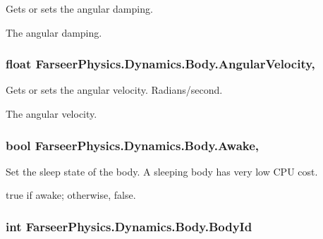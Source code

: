 Gets or sets the angular damping. 

The angular damping.\hypertarget{class_farseer_physics_1_1_dynamics_1_1_body_a140f114a8b8bc2fdffa415b6aa7b9427}{
\subsubsection[{Angular\+Velocity}]{\setlength{\rightskip}{0pt plus 5cm}float Farseer\+Physics.\+Dynamics.\+Body.\+Angular\+Velocity\hspace{0.3cm}{\ttfamily [get]}, {\ttfamily [set]}}}\label{class_farseer_physics_1_1_dynamics_1_1_body_a140f114a8b8bc2fdffa415b6aa7b9427}


Gets or sets the angular velocity. Radians/second. 

The angular velocity.\hypertarget{class_farseer_physics_1_1_dynamics_1_1_body_a6641e547d28ab0560ecc8c37affc2b72}{
\subsubsection[{Awake}]{\setlength{\rightskip}{0pt plus 5cm}bool Farseer\+Physics.\+Dynamics.\+Body.\+Awake\hspace{0.3cm}{\ttfamily [get]}, {\ttfamily [set]}}}\label{class_farseer_physics_1_1_dynamics_1_1_body_a6641e547d28ab0560ecc8c37affc2b72}


Set the sleep state of the body. A sleeping body has very low C\+P\+U cost. 

{\ttfamily true} if awake; otherwise, {\ttfamily false}.\hypertarget{class_farseer_physics_1_1_dynamics_1_1_body_acd7e9a50b5719b3e01ac23dd06477fcc}{
\subsubsection[{Body\+Id}]{\setlength{\rightskip}{0pt plus 5cm}int Farseer\+Physics.\+Dynamics.\+Body.\+Body\+Id\hspace{0.3cm}{\ttfamily [get]}}}\label{class_farseer_physics_1_1_dynamics_1_1_body_acd7e9a50b5719b3e01ac23dd06477fcc}


